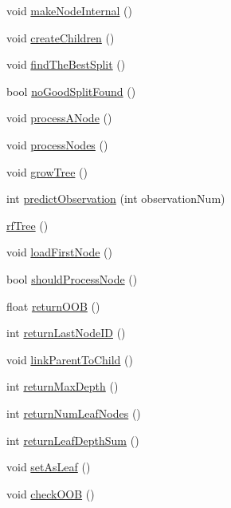 \begin{DoxyCompactItemize}
\item 
void \hyperlink{classfp_1_1rfTree_aaf7bbdde5f7313c3e84853bbf5fdf792}{make\+Node\+Internal} ()
\item 
void \hyperlink{classfp_1_1rfTree_ad226037e7f93c0fa2a1a960e19a87bed}{create\+Children} ()
\item 
void \hyperlink{classfp_1_1rfTree_a51da8e4a46582b26643a4ae392230e77}{find\+The\+Best\+Split} ()
\item 
bool \hyperlink{classfp_1_1rfTree_a618bdc2d22267b4bb4f5e1881b1788f6}{no\+Good\+Split\+Found} ()
\item 
void \hyperlink{classfp_1_1rfTree_ab7760333f6857ab7ce2ee29a7bc16e65}{process\+A\+Node} ()
\item 
void \hyperlink{classfp_1_1rfTree_a7997df3477bc9f73163384c8cd0bcec9}{process\+Nodes} ()
\item 
void \hyperlink{classfp_1_1rfTree_a196d6006e7e2ee0575fa40d7d4621712}{grow\+Tree} ()
\item 
int \hyperlink{classfp_1_1rfTree_aad66c44e2062c163b1560f9bf1bd759f}{predict\+Observation} (int observation\+Num)
\item 
\hyperlink{classfp_1_1rfTree_aace007592f5b94dd9c045207354ea7a6}{rf\+Tree} ()
\item 
void \hyperlink{classfp_1_1rfTree_a8757adc28b68d0a99f95b8bc5d6a38db}{load\+First\+Node} ()
\item 
bool \hyperlink{classfp_1_1rfTree_a36abf82d31ca57670b09da16525dce0d}{should\+Process\+Node} ()
\item 
float \hyperlink{classfp_1_1rfTree_aee6bf6e8e695392880f1cc9ac0102ba6}{return\+O\+OB} ()
\item 
int \hyperlink{classfp_1_1rfTree_a1b8c04f3f3ce362d9627c2ca66d10efd}{return\+Last\+Node\+ID} ()
\item 
void \hyperlink{classfp_1_1rfTree_aceaedc5d54bb429c1a3539f164a93d45}{link\+Parent\+To\+Child} ()
\item 
int \hyperlink{classfp_1_1rfTree_ab439134c1e24059fe74f84ac8eff78dd}{return\+Max\+Depth} ()
\item 
int \hyperlink{classfp_1_1rfTree_a6474edd1b84d70be1712326f9a845139}{return\+Num\+Leaf\+Nodes} ()
\item 
int \hyperlink{classfp_1_1rfTree_a7e0126c03547b4e6ed25b1c452255bbe}{return\+Leaf\+Depth\+Sum} ()
\item 
void \hyperlink{classfp_1_1rfTree_a3583e1f1659ba9a9013a4891709bacb9}{set\+As\+Leaf} ()
\item 
void \hyperlink{classfp_1_1rfTree_a45e47b318c90a1359840ab6161f20ab1}{check\+O\+OB} ()

\end{DoxyCompactItemize}
